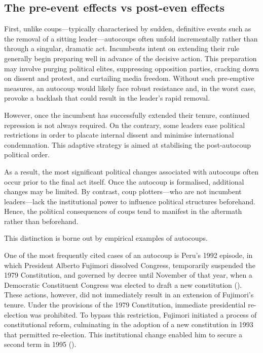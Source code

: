 \documentclass[
  12pt,
]{report}
\begin{document}
\subsection*{\texorpdfstring{\textbf{The pre-event effects vs post-even
effects}}{The pre-event effects vs post-even effects}}\label{the-pre-event-effects-vs-post-even-effects}

First, unlike coups---typically characterised by sudden, definitive
events such as the removal of a sitting leader---autocoups often unfold
incrementally rather than through a singular, dramatic act. Incumbents
intent on extending their rule generally begin preparing well in advance
of the decisive action. This preparation may involve purging political
elites, suppressing opposition parties, cracking down on dissent and
protest, and curtailing media freedom. Without such pre-emptive
measures, an autocoup would likely face robust resistance and, in the
worst case, provoke a backlash that could result in the leader's rapid
removal.

However, once the incumbent has successfully extended their tenure,
continued repression is not always required. On the contrary, some
leaders ease political restrictions in order to placate internal dissent
and minimise international condemnation. This adaptive strategy is aimed
at stabilising the post-autocoup political order.

As a result, the most significant political changes associated with
autocoups often occur prior to the final act itself. Once the autocoup
is formalised, additional changes may be limited. By contrast, coup
plotters---who are not incumbent leaders---lack the institutional power
to influence political structures beforehand. Hence, the political
consequences of coups tend to manifest in the aftermath rather than
beforehand.

This distinction is borne out by empirical examples of autocoups.

One of the most frequently cited cases of an autocoup is Peru's 1992
episode, in which President Alberto Fujimori dissolved Congress,
temporarily suspended the 1979 Constitution, and governed by decree
until November of that year, when a Democratic Constituent Congress was
elected to draft a new constitution (). These actions, however, did not immediately result
in an extension of Fujimori's tenure. Under the provisions of the 1979
Constitution, immediate presidential re-election was prohibited. To
bypass this restriction, Fujimori initiated a process of constitutional
reform, culminating in the adoption of a new constitution in 1993 that
permitted re-election. This institutional change enabled him to secure a
second term in 1995 ().
\end{document}
